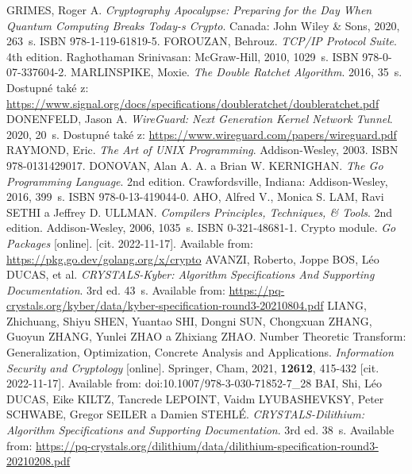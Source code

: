 \begin{thebibliography}{99}
  GRIMES, Roger A. \textit{Cryptography Apocalypse: Preparing for the Day When Quantum Computing Breaks Today-s Crypto}. Canada: John Wiley \& Sons, 2020, 263~s. ISBN 978-1-119-61819-5.
  FOROUZAN, Behrouz. \textit{TCP/IP Protocol Suite}. 4th edition. Raghothaman Srinivasan: McGraw-Hill, 2010, 1029~s. ISBN 978-0-07-337604-2.
  MARLINSPIKE, Moxie. \textit{The Double Ratchet Algorithm}. 2016, 35~s. Dostupné také z: \url{https://www.signal.org/docs/specifications/doubleratchet/doubleratchet.pdf}
  DONENFELD, Jason A. \textit{WireGuard: Next Generation Kernel Network Tunnel}. 2020, 20~s. Dostupné také z: \url{https://www.wireguard.com/papers/wireguard.pdf}
  RAYMOND, Eric. \textit{The Art of UNIX Programming}. Addison-Wesley, 2003. ISBN 978-0131429017.
  DONOVAN, Alan A. A. a Brian W. KERNIGHAN. \textit{The Go Programming Language}. 2nd edition. Crawfordsville, Indiana: Addison-Wesley, 2016, 399~s. ISBN 978-0-13-419044-0.
  AHO, Alfred V., Monica S. LAM, Ravi SETHI a Jeffrey D. ULLMAN. \textit{Compilers Principles, Techniques, \& Tools}. 2nd edition. Addison-Wesley, 2006, 1035~s. ISBN 0-321-48681-1.
  Crypto module. \textit{Go Packages} [online]. [cit. 2022-11-17]. Available from: \url{https://pkg.go.dev/golang.org/x/crypto}
  AVANZI, Roberto, Joppe BOS, Léo DUCAS, et al. \textit{CRYSTALS-Kyber: Algorithm Specifications And Supporting Documentation}. 3rd ed. 43~s. Available from: \url{https://pq-crystals.org/kyber/data/kyber-specification-round3-20210804.pdf}
  LIANG, Zhichuang, Shiyu SHEN, Yuantao SHI, Dongni SUN, Chongxuan ZHANG, Guoyun ZHANG, Yunlei ZHAO a Zhixiang ZHAO. Number Theoretic Transform: Generalization, Optimization, Concrete Analysis and Applications. \textit{Information Security and Cryptology} [online]. Springer, Cham, 2021, \textbf{12612}, 415-432 [cit. 2022-11-17]. Available from: doi:10.1007/978-3-030-71852-7\_28
  BAI, Shi, Léo DUCAS, Eike KILTZ, Tancrede LEPOINT, Vaidm LYUBASHEVKSY, Peter SCHWABE, Gregor SEILER a Damien STEHLÉ. \textit{CRYSTALS-Dilithium: Algorithm Specifications and Supporting Documentation}. 3rd ed. 38~s. Available from: \url{https://pq-crystals.org/dilithium/data/dilithium-specification-round3-20210208.pdf}

  
\end{thebibliography}

% 
% 
%
